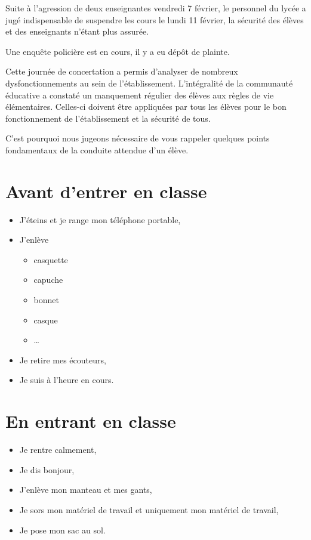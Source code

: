 \documentclass[11pt]{article}
\begin{document}
\UPSTIbuildPage
\title{}
\date{Année 2018 - 2019}

Suite à l'agression de deux enseignantes vendredi 7 février, le personnel du lycée a jugé indispensable de suspendre les cours le lundi 11 février, la sécurité des élèves et des enseignants n'étant plus assurée.

Une enquête policière est en cours, il y a eu dépôt de plainte.

Cette journée de concertation a permis d'analyser de nombreux dysfonctionnements au sein de l'établissement. L'intégralité de la communauté éducative a constaté un manquement régulier des élèves aux règles de vie élémentaires. Celles-ci doivent être appliquées par tous les élèves pour le bon fonctionnement de l'établissement et la sécurité de tous.

C'est pourquoi nous jugeons nécessaire de vous rappeler quelques points fondamentaux de la conduite attendue d'un élève. %

\section{Avant d'entrer en classe}

\begin{itemize}
  \item J'éteins et je range mon téléphone portable,
  \item J'enlève
  \begin{itemize}
    \item casquette
    \item capuche
    \item bonnet
    \item casque
    \item \dots
  \end{itemize}
  \item Je retire mes écouteurs,
  \item Je suis à l'heure en cours. %
\end{itemize}

\section{En entrant en classe}
\begin{itemize}
  \item Je rentre calmement,
  \item Je dis bonjour,
  \item J'enlève mon manteau et mes gants,
  \item Je sors mon matériel de travail et uniquement mon matériel de travail,
  \item Je pose mon sac au sol.
\end{itemize}
\end{document}
